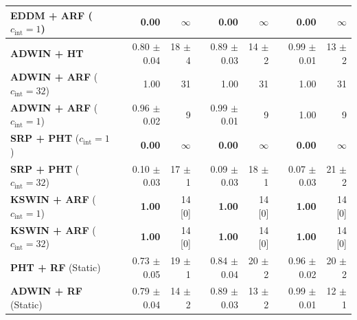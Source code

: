 \begin{table}[t]
{\begin{tabular}{@{}lrrrrrr@{}}
    \textbf{EDDM + ARF} ($c_{\mathrm{int}} = 1$)   & \textbf{0.00} & $\infty$ & \textbf{0.00} & $\infty$ & \textbf{0.00} & $\infty$ \\
    \midrule
    \textbf{ADWIN + HT}                            & 0.80 {\small $\pm$0.04} & 18 {\small $\pm$4} & 0.89 {\small $\pm$0.03} & 14 {\small $\pm$2} & 0.99 {\small $\pm$0.01} & 13 {\small $\pm$2} \\
    \textbf{ADWIN + ARF} ($c_{\mathrm{int}} = 32$) & 1.00 & 31 & 1.00 & 31 & 1.00 & 31 \\
    \textbf{ADWIN + ARF} ($c_{\mathrm{int}} = 1$)  & 0.96 {\small $\pm$0.02} & 9 & 0.99 {\small $\pm$0.01} & 9 & 1.00 & 9 \\
    \midrule
    \textbf{SRP + PHT} ($c_{\mathrm{int}} = 1$)    & \textbf{0.00} & $\infty$ & \textbf{0.00} & $\infty$ & \textbf{0.00} & $\infty$ \\
    \textbf{SRP + PHT} ($c_{\mathrm{int}} = 32$)   & 0.10 {\small $\pm$0.03} & 17 {\small $\pm$1} & 0.09 {\small $\pm$0.03} & 18 {\small $\pm$1} & 0.07 {\small $\pm$0.03} & 21 {\small $\pm$2} \\
    \textbf{KSWIN + ARF} ($c_{\mathrm{int}} = 1$)  & \textbf{1.00} & 14 [0] & \textbf{1.00} & 14 [0] & \textbf{1.00} & 14 [0] \\
    \textbf{KSWIN + ARF} ($c_{\mathrm{int}} = 32$) & \textbf{1.00} & 14 [0] & \textbf{1.00} & 14 [0] & \textbf{1.00} & 14 [0] \\
    \midrule
    \textbf{PHT + RF} (Static)                     & 0.73 {\small $\pm$0.05} & 19 {\small $\pm$1} & 0.84 {\small $\pm$0.04} & 20 {\small $\pm$2} & 0.96 {\small $\pm$0.02} & 20 {\small $\pm$2} \\
    \textbf{ADWIN + RF} (Static)                   & 0.79 {\small $\pm$0.04} & 14 {\small $\pm$2} & 0.89 {\small $\pm$0.03} & 13 {\small $\pm$2} & 0.99 {\small $\pm$0.01} & 12 {\small $\pm$1} \\
    \bottomrule
  \end{tabular}}
\end{table}
